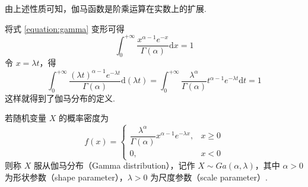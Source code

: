 \begin{note}
    \indent 由上述性质可知，伽马函数是阶乘运算在实数上的扩展.
\end{note}

将式 \eqref{equation:gamma} 变形可得
$$
\int_{0}^{+\infty} \dfrac{x^{\alpha - 1} e^{-x}}{\Gamma(\alpha)} \text{d}x = 1
$$
令 $x = \lambda t$，得
$$
\int_{0}^{+\infty} \dfrac{(\lambda t)^{\alpha - 1} e^{-\lambda t}}{\Gamma(\alpha)} \text{d}(\lambda t) = \int_{0}^{+\infty} \dfrac{\lambda^{\alpha}}{\Gamma(\alpha)} t^{\alpha - 1}  e^{-\lambda t} \text{d}t = 1
$$
这样就得到了伽马分布的定义.

\begin{definition}
    \indent 若随机变量 $X$ 的概率密度为
    $$
    f(x) = \begin{cases}
        \dfrac{\lambda^\alpha}{\Gamma(\alpha)} x^{\alpha - 1} e^{-\lambda x}, & x \geqslant 0 \\[0.5em]
        0, & x<0
    \end{cases}
    $$
    则称 $X$ 服从{\heiti 伽马分布}（Gamma distribution），记作 $X \sim Ga(\alpha,\lambda)$，其中 $\alpha > 0$ 为{\heiti 形状参数}（shape parameter），$\lambda > 0$ 为{\heiti 尺度参数}（scale parameter）.
\end{definition}

